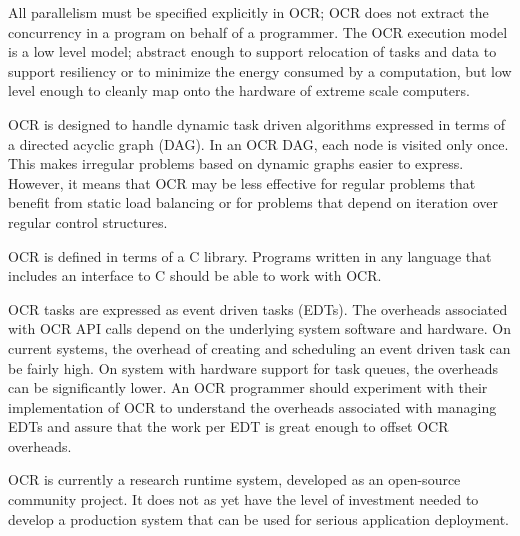 All parallelism must be specified explicitly in OCR; OCR does not
extract the concurrency in a program on behalf of a programmer. The
OCR execution model is a low level model; abstract enough to support
relocation of tasks and data to support resiliency or to minimize the
energy consumed by a computation, but low level enough to cleanly map
onto the hardware of extreme scale computers.

OCR is designed to handle dynamic task driven algorithms expressed in
terms of a directed acyclic graph (DAG). In an OCR DAG, each node is
visited only once. This makes irregular problems based on dynamic
graphs easier to express. However, it means that OCR may be less
effective for regular problems that benefit from static load balancing
or for problems that depend on iteration over regular control
structures.

OCR is defined in terms of a C library. Programs written in any
language that includes an interface to C should be able to work with
OCR.

OCR tasks are expressed as event driven tasks (EDTs).
The overheads associated with OCR API calls depend on the underlying
system software and hardware. On current systems, the overhead of
creating and scheduling an event driven task can be fairly high.
On system with hardware support for task queues, the
overheads can be significantly lower. An OCR programmer should experiment with their
implementation of OCR to understand the overheads associated with managing EDTs and
assure that the work per EDT is great enough to offset OCR overheads.

OCR is currently a research runtime system, developed as an
open-source community project. It does not as yet have the level of
investment needed to develop a production system that can be used for
serious application deployment.
